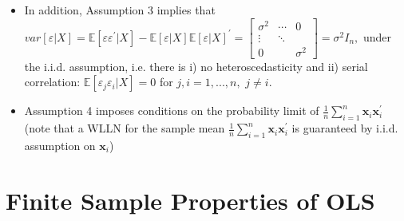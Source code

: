 \documentclass[notes=show]{beamer}
\begin{document}
\begin{frame}%


\begin{itemize}
\item In addition, Assumption 3 implies that $var[\varepsilon |X]=\mathbb{E}%
[\varepsilon \varepsilon ^{\prime }|X]-\mathbb{E}[\varepsilon |X]\mathbb{E}%
[\varepsilon |X]^{\prime }=\left[ 
\begin{array}{ccc}
\sigma ^{2} & \cdots & 0 \\ 
\vdots & \ddots &  \\ 
0 &  & \sigma ^{2}%
\end{array}%
\right] =\sigma ^{2}I_{n},$ under the i.i.d. assumption, i.e. there is i) no
heteroscedasticity and ii) serial correlation: $\mathbb{E}[\varepsilon
_{j}\varepsilon _{i}|X]=0$ for $j,i=1,...,n,$ $j\neq i.$

\item Assumption 4 imposes conditions on the probability limit of $\frac{1}{n%
}\sum_{i=1}^{n}\mathbf{x}_{i}\mathbf{x}_{i}^{\prime }$ (note that a WLLN for
the sample mean $\frac{1}{n}\sum_{i=1}^{n}\mathbf{x}_{i}\mathbf{x}%
_{i}^{\prime }$ is guaranteed by i.i.d. assumption on $\mathbf{x}_{i}$)
\end{itemize}

\end{frame}%

\section{Finite Sample Properties of OLS}
\end{document}
